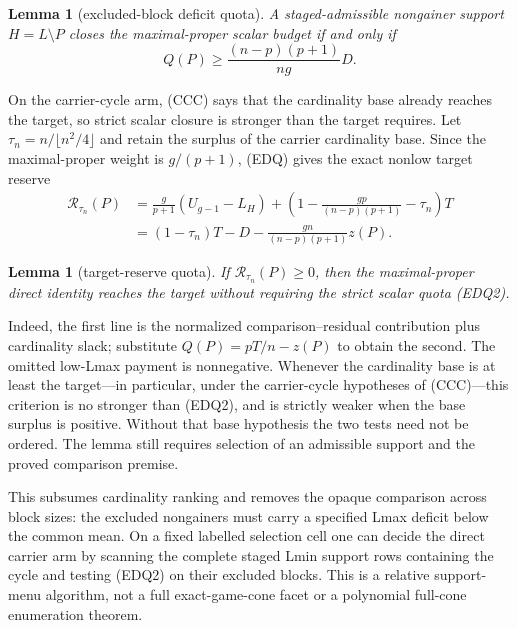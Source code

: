 \documentclass[11pt]{article}
\newtheorem{lemma}[theorem]{Lemma}
\begin{document}
\begin{lemma}[excluded-block deficit quota]
A staged-admissible nongainer support $H=L\setminus P$ closes the
maximal-proper scalar budget if and only if
\[
 Q(P)\ge \frac{(n-p)(p+1)}{ng}D.                    \tag{EDQ2}
\]
\end{lemma}

On the carrier-cycle arm, (CCC) says that the cardinality base already
reaches the target, so strict scalar closure is stronger than the target
requires.  Let
$\tau_n=n/\lfloor n^2/4\rfloor$ and retain the surplus of the carrier
cardinality base.  Since the maximal-proper weight is $g/(p+1)$, (EDQ)
gives the exact nonlow target reserve
\begin{equation}
 \tag{EDQ5}
 \begin{aligned}
 \mathcal R_{\tau_n}(P)
 &=\frac{g}{p+1}(U_{g-1}-L_H)
 +\left(1-\frac{gp}{(n-p)(p+1)}-\tau_n\right)T\\
 &=(1-\tau_n)T-D-\frac{gn}{(n-p)(p+1)}z(P).
 \end{aligned}
\end{equation}

\begin{lemma}[target-reserve quota]
If $\mathcal R_{\tau_n}(P)\ge0$, then the maximal-proper direct identity
reaches the target without requiring the strict scalar quota (EDQ2).
\end{lemma}

Indeed, the first line is the normalized comparison--residual contribution
plus cardinality slack; substitute $Q(P)=pT/n-z(P)$ to obtain the second.
The omitted low-Lmax payment is nonnegative.  Whenever the cardinality base
is at least the target---in particular, under the carrier-cycle hypotheses of
(CCC)---this criterion is no stronger than (EDQ2), and is strictly weaker
when the base surplus is positive.  Without that base hypothesis the two
tests need not be ordered.  The lemma still requires selection of an
admissible support and the proved comparison premise.

This subsumes cardinality ranking and removes the opaque comparison across
block sizes: the excluded nongainers must carry a specified Lmax deficit
below the common mean.  On a fixed labelled selection cell one can decide
the direct carrier arm by scanning the complete staged Lmin support rows
containing the cycle and testing (EDQ2) on their excluded blocks.  This is a
relative support-menu algorithm, not a full exact-game-cone facet or a
polynomial full-cone enumeration theorem.
\end{document}
